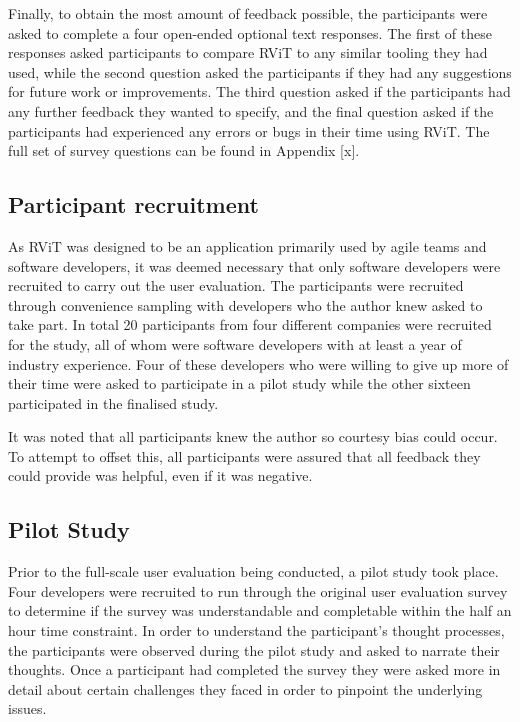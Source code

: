 \documentclass[l4proj.tex]{subfiles}
\begin{document}
Finally, to obtain the most amount of feedback possible, the participants were asked to complete a four open-ended optional text responses. The first of these responses asked participants to compare RViT to any similar tooling they had used, while the second question asked the participants if they had any suggestions for future work or improvements. The third question asked if the participants had any further feedback they wanted to specify, and the final question asked if the participants had experienced any errors or bugs in their time using RViT. The full set of survey questions can be found in Appendix [x].


\subsection{Participant recruitment}
As RViT was designed to be an application primarily used by agile teams and software developers, it was deemed necessary that only software developers were recruited to carry out the user evaluation. The participants were recruited through convenience sampling with developers who the author knew asked to take part. In total 20 participants from four different companies were recruited for the study, all of whom were software developers with at least a year of industry experience. Four of these developers who were willing to give up more of their time were asked to participate in a pilot study while the other sixteen participated in the finalised study.

It was noted that all participants knew the author so courtesy bias could occur. To attempt to offset this, all participants were assured that all feedback they could provide was helpful, even if it was negative.


\subsection{Pilot Study}
Prior to the full-scale user evaluation being conducted, a pilot study took place. Four developers were recruited to run through the original user evaluation survey to determine if the survey was understandable and completable within the half an hour time constraint. In order to understand the participant's thought processes, the participants were observed during the pilot study and asked to narrate their thoughts. Once a participant had completed the survey they were asked more in detail about certain challenges they faced in order to pinpoint the underlying issues. 
\end{document}
